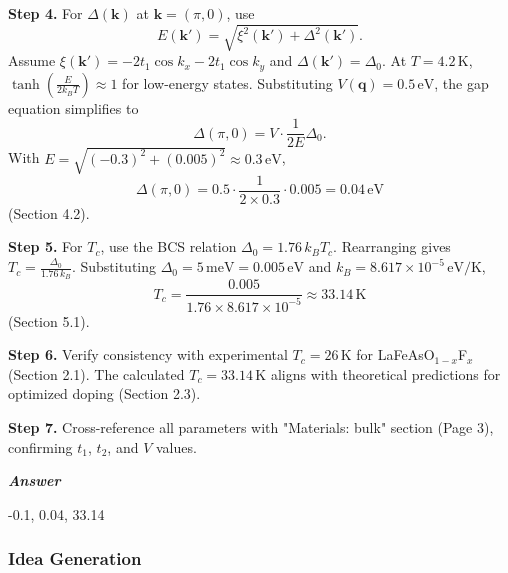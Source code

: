 \begin{tcolorbox}[
    breakable,
    title=Example of Scientific Deep Research in Physics,
    colback=LighterGray,
    colframe=DeepPurple,
    colbacktitle=DeepPurple,
    coltitle=White,
]
\textbf{\textcolor{CaseOrange}{Step 4.}} For \( \Delta(\mathbf{k}) \) at \( \mathbf{k} = (\pi, 0) \), use
\[
E(\mathbf{k}') = \sqrt{ \xi^2(\mathbf{k}') + \Delta^2(\mathbf{k}') }.
\]
Assume \( \xi(\mathbf{k}') = -2t_1 \cos k_x - 2t_1 \cos k_y \) and \( \Delta(\mathbf{k}') = \Delta_0 \).
At \( T = 4.2\,\text{K} \), \( \tanh\left( \frac{E}{2 k_B T} \right) \approx 1 \) for low-energy states. Substituting \( V(\mathbf{q}) = 0.5\,\text{eV} \), the gap equation simplifies to
\[
\Delta(\pi, 0) = V \cdot \frac{1}{2E} \Delta_0.
\]
With \( E = \sqrt{(-0.3)^2 + (0.005)^2} \approx 0.3\,\text{eV} \),
\[
\Delta(\pi, 0) = 0.5 \cdot \frac{1}{2 \times 0.3} \cdot 0.005 = 0.04\,\text{eV}
\]
(Section 4.2).

\textbf{\textcolor{CaseOrange}{Step 5.}} For \( T_c \), use the BCS relation \( \Delta_0 = 1.76\,k_B T_c \). Rearranging gives \( T_c = \frac{\Delta_0}{1.76\,k_B} \).
Substituting \( \Delta_0 = 5\,\text{meV} = 0.005\,\text{eV} \) and \( k_B = 8.617 \times 10^{-5}\,\text{eV/K} \),
\[
T_c = \frac{0.005}{1.76 \times 8.617 \times 10^{-5}} \approx 33.14\,\text{K}
\]
(Section 5.1).

\textbf{\textcolor{CaseOrange}{Step 6.}} Verify consistency with experimental \( T_c = 26\,\text{K} \) for LaFeAsO\(_{1-x}\)F\(_x\) (Section 2.1). The calculated \( T_c = 33.14\,\text{K} \) aligns with theoretical predictions for optimized doping (Section 2.3).

\textbf{\textcolor{CaseOrange}{Step 7.}} Cross-reference all parameters with "Materials: bulk" section (Page 3), confirming \( t_1 \), \( t_2 \), and \( V \) values.

\textbf{\emph{\textcolor{DeepPurple}{Answer}}}

-0.1, 0.04, 33.14

\end{tcolorbox}


\subsubsection{Idea Generation}




